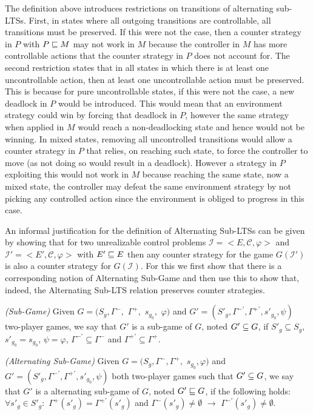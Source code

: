 The definition above introduces  restrictions on transitions of alternating sub-LTSs. 
First, in states where all outgoing transitions are controllable, all transitions must be preserved. 
If this were not the case, then a counter strategy in $P$ with $P \sqsubseteq M$ may not work in $M$ because the controller in $M$ has more controllable actions that the counter strategy in $P$ does not account for. 
The second restriction states that in all states in which there is at least one uncontrollable action, then at least one uncontrollable action must be preserved. This is because for pure uncontrollable states, if this were not the case, a new deadlock in $P$ would be introduced. This would mean that an environment strategy could win by forcing that deadlock in $P$, however the same strategy when applied in $M$ would reach a non-deadlocking state and hence would not be winning. In mixed states, removing all uncontrolled transitions would allow a counter strategy in $P$ that relies, on reaching such state, to force the controller to move (as not doing so would result in a deadlock). However a strategy in $P$ exploiting this would not work in $M$ because reaching the same state, now a mixed state, the controller may defeat the same environment strategy by not picking any controlled action since the environment is obliged to progress in this case. 

An informal justification for the definition of Alternating Sub-LTSs can be given by showing that for two unrealizable control problems $\mathcal{I} = <E, \mathcal{C}, \varphi>$ and $\mathcal{I'} = <E', \mathcal{C}, \varphi>$ with $E' \sqsubseteq E$ then any counter strategy for the game $G(\mathcal{I'})$ is also a counter strategy for $G(\mathcal{I})$. For this we first show that there is a corresponding notion of Alternating Sub-Game and then use this to show that, indeed, the Alternating Sub-LTS relation preserves counter strategies.  

\begin{definition}\label{def:sub-game}\emph{(Sub-Game)}
Given $G = (S_g, \Gamma^{-},$ $\Gamma^{+},$ $s_{g_{0}}$$,$ $\varphi)$ and
$G' = (S'_g, \Gamma^{-\prime}, \Gamma^{+\prime},s'_{g_{0}}, \psi)$ two-player games, we say that $G'$ is a sub-game of $G$, noted
$G' \subseteq G$, if $S'_g \subseteq S_g$, $s'_{g_{0}}=s_{g_{0}}$, $\psi = \varphi$, $\Gamma^{-\prime}\subseteq \Gamma^{-}$ and
$\Gamma^{+\prime}\subseteq \Gamma^{+}$.
\end{definition}

\begin{definition}\label{def:alternating-sub-game}\emph{(Alternating Sub-Game)}
Given $G = (S_g, \Gamma^{-}, \Gamma^{+},$ $s_{g_{0}}, \varphi)$ and
$G' = (S'_g, \Gamma^{-\prime}, \Gamma^{+\prime},s'_{g_{0}}, \psi)$ both two-player games such that $G' \subseteq G$, we say that $G'$ is a alternating sub-game of $G$, noted
$G'\sqsubseteq G$, if the following holds: $\forall s'_g \in S'_g:$ 
$\Gamma^{+}(s'_g)=\Gamma^{+\prime}(s'_g)$ and $\Gamma^{-}(s'_g)\neq \emptyset$ $\rightarrow$ $\Gamma^{-\prime}(s'_g) \neq \emptyset$. 
\end{definition}

